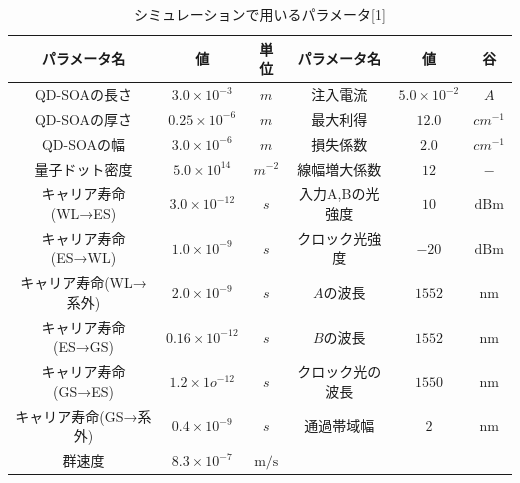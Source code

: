\documentclass[dvipdfmx]{ujarticle}
\begin{document}
    \begin{table}[H]
      \caption{シミュレーションで用いるパラメータ[1]}
      \centering
        \begin{tabular}{ccc||ccc}
          \hline
          パラメータ名 & 値 & 単位 & パラメータ名 & 値 & 谷\\
          \hline
          QD-SOAの長さ & $ 3.0 \times 10^{-3} $ & $m$ & 注入電流 & $5.0 \times 10^{-2}  $ & $A$\\
          QD-SOAの厚さ & $ 0.25 \times 10^{-6} $ & $m$ & 最大利得 & $12.0 $ & $cm^{-1}$\\
          QD-SOAの幅 & $ 3.0 \times 10^{-6} $ & $m$ & 損失係数 & $2.0$ & $cm^{-1}$\\
          量子ドット密度 & $ 5.0 \times 10^{14} $ & $m^{-2}$ & 線幅増大係数 & $ 12 $ & $-$ \\
          キャリア寿命(WL→ES) & $ 3.0 \times 10^{-12} $ & $s$ & 入力A,Bの光強度 & $ 10$ & $\mathrm{dBm}$ \\
          キャリア寿命(ES→WL) & $ 1.0 \times 10^{-9} $ & $s$ & クロック光強度 & $ -20 $ & $\mathrm{dBm}$\\
          キャリア寿命(WL→系外) & $ 2.0 \times 10^{-9} $ & $s$ & $A$の波長 & $ 1552$ & $\mathrm{nm}$\\
          キャリア寿命(ES→GS) & $ 0.16 \times 10^{-12} $ & $s$ & $B$の波長 & $ 1552$ & $\mathrm{nm}$\\
          キャリア寿命(GS→ES) & $ 1.2 \times 1o^{-12} $ & $s$ & クロック光の波長 & $ 1550$ & $\mathrm{nm}$\\
          キャリア寿命(GS→系外) & $ 0.4 \times 10^{-9} $ & $s$& 通過帯域幅 & $ 2 $ & $\mathrm{nm}$\\
          群速度   & $ 8.3 \times 10^{-7}$ & $\mathrm{m/s}$\\
          \hline
        \end{tabular}
    \end{table}
\end{document}
